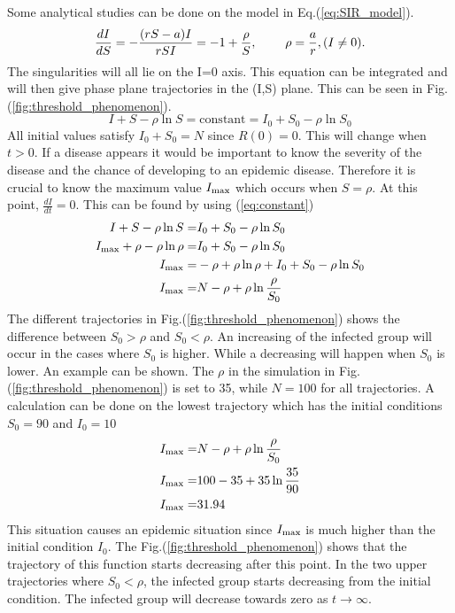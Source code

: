 \documentclass[%
twoside,                 %
final,                   %
chapterprefix=true,      %
open=right               %
10pt]{book}
\begin{document}
Some analytical studies can be done on the model in Eq.(\ref{eq:SIR_model}).
\begin{equation} 
\frac{dI}{dS} = -\frac{(rS-a)I}{rSI} = -1 + \frac{\rho}{S},\hspace{8mm}\rho=\frac{a}{r}, (I\neq0).
\end{equation}
The singularities will all lie on the I=0 axis. This equation can be integrated and will then give phase plane trajectories in the (I,S) plane. This can be seen in Fig.(\ref{fig:threshold_phenomenon}).
\begin{equation} \label{eq:constant}
I+S-\rho \ln S = \textrm{constant} = I_0 + S_0 - \rho \ln S_0
\end{equation}
All initial values satisfy $I_0+S_0=N$ since $R(0) = 0$. This will change when $t>0$. If a disease appears it would be important to know the severity of the disease and the chance of developing to an epidemic disease. Therefore it is crucial to know the maximum value $I_{\textrm{max}}$ which occurs when $S=\rho$. At this point, $\frac{dI}{dt}=0$. This can be found by using (\ref{eq:constant})
\begin{align} 
I+S-\rho \ln S =& I_0 + S_0 - \rho \ln S_0 \nonumber \\
I_{\textrm{max}}+\rho-\rho \ln \rho =& I_0 + S_0 - \rho \ln S_0\nonumber \\
I_{\textrm{max}}=&- \rho+\rho \ln \rho + I_0 + S_0 - \rho \ln S_0\nonumber \\
I_{\textrm{max}}=&N - \rho + \rho \ln\frac{\rho}{S_0} \label{eq:max_I}
\end{align}
The different trajectories in Fig.(\ref{fig:threshold_phenomenon}) shows the difference between $S_0 > \rho$ and $S_0 < \rho$. An increasing of the infected group will occur in the cases where $S_0$ is higher. While a decreasing will happen when $S_0$ is lower. An example can be shown. The $\rho$ in the simulation in Fig.(\ref{fig:threshold_phenomenon}) is set to 35, while $N=100$ for all trajectories. A calculation can be done on the lowest trajectory which has the initial conditions $S_0= 90$ and $I_0= 10$
\begin{align*}
I_{\textrm{max}} =& N-\rho + \rho \ln \frac{\rho}{S_0}\\
I_{\textrm{max}} =& 100-35 + 35 \ln \frac{35}{90}\\
I_{\textrm{max}} =& 31.94
\end{align*}
This situation causes an epidemic situation since $I_{\textrm{max}}$ is much higher than the initial condition $I_0$. The Fig.(\ref{fig:threshold_phenomenon}) shows that the trajectory of this function starts decreasing after this point. In the two upper trajectories where $S_0 < \rho$, the infected group starts decreasing from the initial condition. The infected group will decrease towards zero as $t\rightarrow \infty$.
\end{document}
